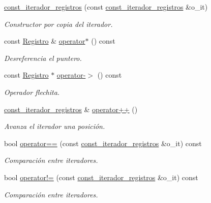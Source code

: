 \begin{DoxyCompactItemize}
\item 
\mbox{\hyperlink{classTabla_1_1const__iterador__registros_a904a84af50ced6c3d9e77e10d6e5192a}{const\+\_\+iterador\+\_\+registros}} (const \mbox{\hyperlink{classTabla_1_1const__iterador__registros}{const\+\_\+iterador\+\_\+registros}} \&o\+\_\+it)
\begin{DoxyCompactList}\small\item\em Constructor por copia del iterador. \end{DoxyCompactList}\item 
const \mbox{\hyperlink{classRegistro}{Registro}} \& \mbox{\hyperlink{classTabla_1_1const__iterador__registros_a821dca3f8ddeb2e3eb4142b1a73b31dd}{operator$\ast$}} () const
\begin{DoxyCompactList}\small\item\em Desreferencia el puntero. \end{DoxyCompactList}\item 
const \mbox{\hyperlink{classRegistro}{Registro}} $\ast$ \mbox{\hyperlink{classTabla_1_1const__iterador__registros_aa3ceabec92850b9bd3b4d5d704390aba}{operator-\/$>$}} () const
\begin{DoxyCompactList}\small\item\em Operador flechita. \end{DoxyCompactList}\item 
\mbox{\hyperlink{classTabla_1_1const__iterador__registros}{const\+\_\+iterador\+\_\+registros}} \& \mbox{\hyperlink{classTabla_1_1const__iterador__registros_a396373a330a7c56e3112df2bcccef885}{operator++}} ()
\begin{DoxyCompactList}\small\item\em Avanza el iterador una posición. \end{DoxyCompactList}\item 
bool \mbox{\hyperlink{classTabla_1_1const__iterador__registros_acca3075015ddaa2e02fd9c79db55e70d}{operator==}} (const \mbox{\hyperlink{classTabla_1_1const__iterador__registros}{const\+\_\+iterador\+\_\+registros}} \&o\+\_\+it) const
\begin{DoxyCompactList}\small\item\em Comparación entre iteradores. \end{DoxyCompactList}\item 
bool \mbox{\hyperlink{classTabla_1_1const__iterador__registros_a745133488ec23a775322844c4d6dda58}{operator!=}} (const \mbox{\hyperlink{classTabla_1_1const__iterador__registros}{const\+\_\+iterador\+\_\+registros}} \&o\+\_\+it) const
\begin{DoxyCompactList}\small\item\em Comparación entre iteradores. \end{DoxyCompactList}\end{DoxyCompactItemize}
